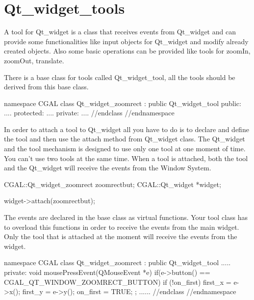 
\section{Qt\_widget\_tools}
\label{Qt_widget_tools}


\ccDefinition

A tool for Qt\_widget is a class that receives events from Qt\_widget and can 
provide some functionalities like input objects for Qt\_widget and modify 
already created objects. Also some basic operations can be provided like tools
for zoomIn, zoomOut, translate.

There is a base class for tools called Qt\_widget\_tool, all the tools should 
be derived from this base class.
\begin{ccExampleCode}
namespace CGAL {
class Qt_widget_zoomrect : public Qt_widget_tool
{
public:
	....
protected:
	....
private:
	....
}//endclass
}//endnamespace
\end{ccExampleCode}
In order to attach a tool to Qt\_widget all you have to do is to declare and 
define the tool and then use the attach method from Qt\_widget class. The 
Qt\_widget and the tool mechanism is designed to use only one tool at one moment of time. You can't use two tools at the same time. When a tool is attached, both the tool and the Qt\_widget will receive the events from the Window System.
\begin{ccExampleCode}
CGAL::Qt_widget_zoomrect	zoomrectbut;
CGAL::Qt_widget			*widget;

widget->attach(zoomrectbut);
\end{ccExampleCode}
The events are declared in the base class as virtual functions. Your tool class
has to overload this functions in order to receive the events from the main 
widget. Only the tool that is attached at the moment will receive the events
from the widget.
\begin{ccExampleCode}
namespace CGAL {
class Qt_widget_zoomrect : public Qt_widget_tool
{
.....
private:
  void mousePressEvent(QMouseEvent *e)
  {
    if(e->button() == CGAL_QT_WINDOW_ZOOMRECT_BUTTON)
    {
      if (!on_first)
      {
        first_x = e->x();
        first_y = e->y();
        on_first = TRUE;
      }
    }
  };
......
}//endclass
}//endnamespace
\end{ccExampleCode}

